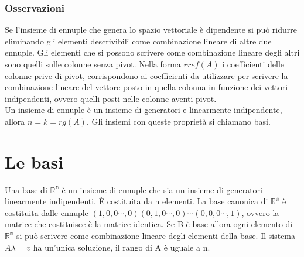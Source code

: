 \subsubsection{Osservazioni}
Se l'insieme di ennuple che genera lo spazio vettoriale \`e dipendente si pu\`o ridurre eliminando gli elementi descrivibili come combinazione lineare di altre due ennuple. Gli elementi che si possono scrivere come combinazione lineare degli altri sono quelli sulle colonne senza pivot. Nella forma $rref(A)$ i coefficienti delle colonne prive di pivot, corrispondono ai coefficienti da utilizzare per scrivere la combinazione lineare del vettore posto in quella colonna in funzione dei vettori indipendenti, ovvero quelli posti nelle colonne aventi pivot.\\
Un insieme di ennuple \`e un insieme di generatori e linearmente indipendente, allora $n=k=rg(A)$. Gli insiemi con queste propriet\`a si chiamano basi.
\section{Le basi}
Una base di $\mathbb{R^n}$ \`e un insieme di ennuple che sia un insieme di generatori linearmente indipendenti. \`E costituita da n elementi. La base canonica di 
$\mathbb{R^n}$ \`e costituita dalle ennuple $(1,0,0\cdots,0)(0,1,0\cdots,0)\cdots(0,0,0\cdots,1)$, ovvero la matrice che costituisce \`e la matrice identica. Se B \`e base 
allora ogni elemento di $\mathbb{R^n}$ si pu\`o scrivere come combinazione lineare degli elementi della base. Il sistema $A\lambda=v$ ha un'unica soluzione, il rango di A \`e 
uguale a n. 